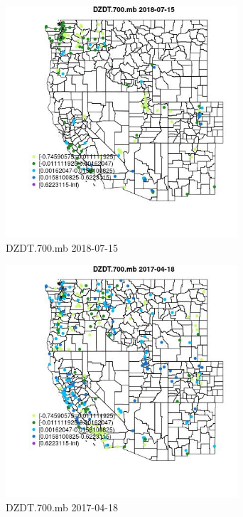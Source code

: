 \begin{figure} 
\centering  
\includegraphics[width=0.77\textwidth]{Code_Outputs/Report_ML_input_PM25_Step4_part_e_de_duplicated_aves_compiled_2019-05-20wNAs_MapObsDZDT700mb2018-07-15.jpg} 
\caption{\label{fig:Report_ML_input_PM25_Step4_part_e_de_duplicated_aves_compiled_2019-05-20wNAsMapObsDZDT700mb2018-07-15}DZDT.700.mb 2018-07-15} 
\end{figure} 
 

\begin{figure} 
\centering  
\includegraphics[width=0.77\textwidth]{Code_Outputs/Report_ML_input_PM25_Step4_part_e_de_duplicated_aves_compiled_2019-05-20wNAs_MapObsDZDT700mb2017-04-18.jpg} 
\caption{\label{fig:Report_ML_input_PM25_Step4_part_e_de_duplicated_aves_compiled_2019-05-20wNAsMapObsDZDT700mb2017-04-18}DZDT.700.mb 2017-04-18} 
\end{figure} 
 

